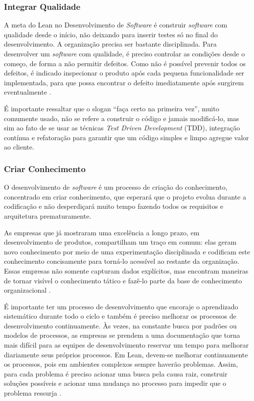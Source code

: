 \subsubsection[Integrar Qualidade]{Integrar Qualidade}

A meta do Lean no Desenvolvimento de \textit{Software} é construir \textit{software} com qualidade desde o início, não deixando para inserir testes só no final do desenvolvimento. A organização precisa ser bastante disciplinada. Para desenvolver um \textit{software} com qualidade, é preciso controlar as condições desde o começo, de forma a não permitir defeitos. Como não é possível prevenir todos os defeitos, é indicado inspecionar o produto após cada pequena funcionalidade ser implementada, para que possa encontrar o defeito imediatamente após surgirem eventualmente \cite{poppendieck}.

É importante ressaltar que o slogan “faça certo na primeira vez”, muito comumente usado, não se refere a construir o código e jamais modificá-lo, mas sim ao fato de se usar as técnicas \textit{Test Driven Development} (TDD), integração contínua e refatoração para garantir que um código simples e limpo agregue valor ao cliente. 

\subsubsection[Criar Conhecimento]{Criar Conhecimento}

O desenvolvimento de \textit{software} é um processo de criação do conhecimento, concentrado em criar conhecimento, que esperará que o projeto evolua durante a codificação e não desperdiçará muito tempo fazendo todos os requisitos e arquitetura prematuramente. 

As empresas que já mostraram uma excelência a longo prazo, em desenvolvimento de produtos, compartilham um traço em comum: elas geram novo conhecimento por meio de uma experimentação disciplinada e codificam este conhecimento concisamente para torná-lo acessível ao restante da organização. Essas empresas não somente capturam dados explícitos, mas encontram maneiras de tornar visível o conhecimento tático e fazê-lo parte da base de conhecimento organizacional \cite{nonaka}.

É importante ter um processo de desenvolvimento que encoraje o aprendizado sistemático durante todo o ciclo e também é preciso melhorar os processos de desenvolvimento continuamente. Às vezes, na constante busca por padrões ou modelos de processos, as empresas se prendem a uma documentação que torna mais difícil para as equipes de desenvolvimento reservar um tempo para melhorar diariamente seus próprios processos. Em Lean, devem-se melhorar continuamente os processos, pois em ambientes complexos sempre haverão problemas. Assim, para cada problema é preciso acionar uma busca pela causa raiz, construir soluções possíveis e acionar uma mudança no processo para impedir que o problema ressurja \cite{poppendieck}. 

